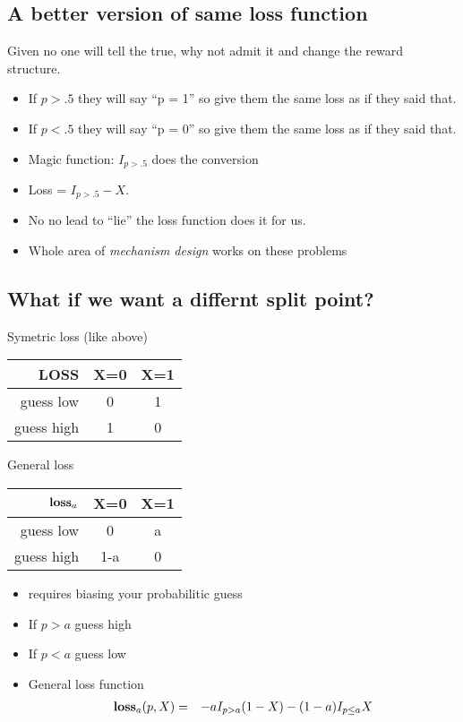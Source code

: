 \documentclass[20pt]{extarticle} %
\begin{document}
\subsection*{A better version of same loss function}
Given no one will tell the true, why not admit it and change the
reward structure.
\begin{itemize}
\item If $p > .5$ they will say ``p = 1'' so give them the same loss
as if they said that.
\item If $p < .5$ they will say ``p = 0'' so give them the same loss
as if they said that.
\item Magic function: $I_{p > .5}$ does the conversion
\item Loss = $I_{p > .5} - X$.
\item No no lead to ``lie'' the loss function does it for us.
\item Whole area of {\em mechanism design} works on these problems
\end{itemize}

\subsection*{What if we want a differnt split point?}

Symetric loss (like above) \\
\begin{tabular}{r|c|c}
{\bf LOSS} & X=0 & X=1 \\ \hline
guess low  & 0   & 1  \\ \hline
guess high & 1   & 0 
\end{tabular}

General loss\\
\begin{tabular}{r|c|c}
$\hbox{\bf loss}_a$ & X=0 & X=1 \\ \hline
guess low  & 0   & a  \\ \hline
guess high & 1-a & 0 
\end{tabular}

\begin{itemize}
\item requires biasing your probabilitic guess
\item If $p>a$ guess high
\item If $p<a$ guess low
\item General loss function
\begin{eqnarray*}
\hbox{\bf loss}_a(p,X) &= &- aI_{p > a}(1-X) - (1-a)I_{p \le a}X \\
\end{eqnarray*}

\end{itemize}
\end{document}
